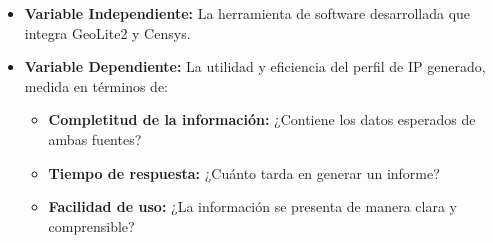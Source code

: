 \begin{itemize}
    \item \textbf{Variable Independiente:} La herramienta de software desarrollada que integra GeoLite2 y Censys.
    \item \textbf{Variable Dependiente:} La utilidad y eficiencia del perfil de IP generado, medida en términos de:
    \begin{itemize}
        \item \textbf{Completitud de la información:} ¿Contiene los datos esperados de ambas fuentes?
        \item \textbf{Tiempo de respuesta:} ¿Cuánto tarda en generar un informe?
        \item \textbf{Facilidad de uso:} ¿La información se presenta de manera clara y comprensible?
    \end{itemize}
\end{itemize}

